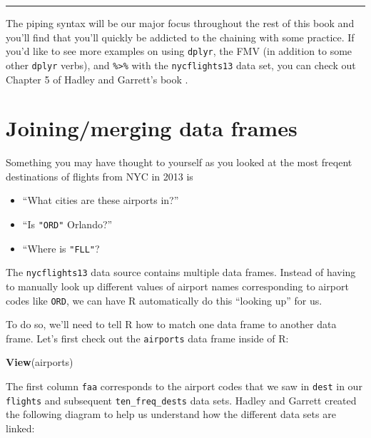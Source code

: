 \documentclass[]{tufte-book}
\newenvironment{Shaded}{\begin{snugshade}}{\end{snugshade}}
\newcommand{\KeywordTok}[1]{\textcolor[rgb]{0.13,0.29,0.53}{\textbf{{#1}}}}
\newcommand{\NormalTok}[1]{{#1}}
\let\oldrule=\rule
\renewcommand{\rule}[1]{\oldrule{\linewidth}}
\providecommand{\tightlist}{%
  \setlength{\itemsep}{0pt}\setlength{\parskip}{0pt}}
\begin{document}
\begin{center}\rule{0.5\linewidth}{\linethickness}\end{center}

The piping syntax will be our major focus throughout the rest of this
book and you'll find that you'll quickly be addicted to the chaining
with some practice. If you'd like to see more examples on using
\texttt{dplyr}, the FMV (in addition to some other \texttt{dplyr}
verbs), and \texttt{\%\textgreater{}\%} with the \texttt{nycflights13}
data set, you can check out Chapter 5 of Hadley and Garrett's book
\citep{rds2016}.

\section{Joining/merging data frames}\label{joiningmerging-data-frames}

Something you may have thought to yourself as you looked at the most
freqent destinations of flights from NYC in 2013 is

\begin{itemize}
\tightlist
\item
  ``What cities are these airports in?''
\item
  ``Is \texttt{"ORD"} Orlando?''
\item
  ``Where is \texttt{"FLL"}?
\end{itemize}

The \texttt{nycflights13} data source contains multiple data frames.
Instead of having to manually look up different values of airport names
corresponding to airport codes like \texttt{ORD}, we can have R
automatically do this ``looking up'' for us.

To do so, we'll need to tell R how to match one data frame to another
data frame. Let's first check out the \texttt{airports} data frame
inside of R:

\begin{Shaded}
\begin{Highlighting}[]
\KeywordTok{View}\NormalTok{(airports)}
\end{Highlighting}
\end{Shaded}

The first column \texttt{faa} corresponds to the airport codes that we
saw in \texttt{dest} in our \texttt{flights} and subsequent
\texttt{ten\_freq\_dests} data sets. Hadley and Garrett \citep{rds2016}
created the following diagram to help us understand how the different
data sets are linked:
\end{document}
